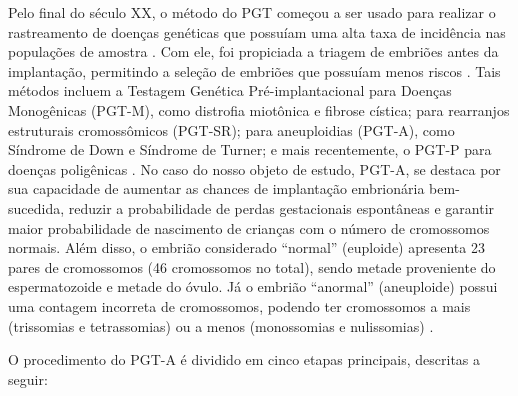 Pelo final do século XX, o método do PGT começou a ser usado para realizar o rastreamento de doenças genéticas que possuíam uma alta taxa de incidência nas populações de amostra \cite{yang2024}. Com ele, foi propiciada a triagem de embriões antes da implantação, permitindo a seleção de embriões que possuíam menos riscos \cite{scienceofbiogenetics2024}. Tais métodos incluem a Testagem Genética Pré-implantacional para Doenças Monogênicas (PGT-M), como distrofia miotônica e fibrose cística; para rearranjos estruturais cromossômicos (PGT-SR); para aneuploidias (PGT-A), como Síndrome de Down e Síndrome de Turner; e mais recentemente, o PGT-P para doenças poligênicas \cite{yang2024}. No caso do nosso objeto de estudo, PGT-A, se destaca por sua capacidade de aumentar as chances de implantação embrionária bem-sucedida, reduzir a probabilidade de perdas gestacionais espontâneas e garantir maior probabilidade de nascimento de crianças com o número de cromossomos normais\cite{yang2024}. Além disso, o embrião considerado “normal” (euploide) apresenta 23 pares de cromossomos (46 cromossomos no total), sendo metade proveniente do espermatozoide e metade do óvulo. Já o embrião “anormal” (aneuploide) possui uma contagem incorreta de cromossomos, podendo ter cromossomos a mais (trissomias e tetrassomias) ou a menos (monossomias e nulissomias) \cite{cnyfertility2024}. 

O procedimento do PGT-A é dividido em cinco etapas principais, descritas a seguir:

